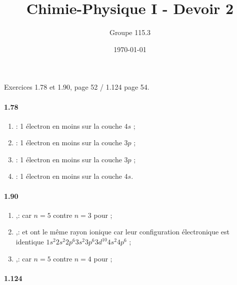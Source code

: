 \documentclass{article}
\title{Chimie-Physique I - Devoir 2}
\author{Groupe 115.3}
\date{\today}
\begin{document}
\maketitle

Exercices 1.78 et 1.90, page 52 / 1.124 page 54.

\paragraph{1.78}

\begin{enumerate}
  \item {} : 1 électron en moins sur la couche $4s$ ;
  \item {}: 1 électron en moins sur la couche $3p$ ;
  \item {}: 1 électron en moins sur la couche $3p$ ;
  \item {}: 1 électron en moins sur la couche $4s$.
\end{enumerate}

\paragraph{1.90}

\begin{enumerate}
	\item {},:  car $n = 5$ contre $n = 3$ pour  ;
	\item {},:  et  ont le même rayon ionique 
	car leur configuration électronique est identique $1s^2 2s^2 2p^6 3s^2 3p^6 3d^{10}4s^2 4p^6$ ;
	\item {},:  car $n = 5$ contre $n = 4$ pour  ;
\end{enumerate}

\paragraph{1.124}

\end{document}
